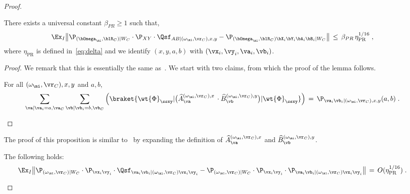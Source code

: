 \begin{proof}
	\begin{lemma}
		\label{lem:anchorpr_main_lemma}
		There exists a universal constant $\beta_{PR} \geq 1$ such that,
		\[
		\Ex_I \big \| \P_{(\bOmega_{\mi}, \blR_C) | W_C} \cdot \P_{XY} \cdot \Qsf_{AB | (\omega_{\mi}, \vr_C), x,y} - \P_{(\bOmega_{\mi}, \blR_C) \bX_i \bY_i  \bA_i \bB_i | W_C} \big \| \,\leq \, \beta_{PR}  \,\eta_{\text{PR}}^{1/16} \;,
		\]
		where $\eta_{\text{PR}}$ is defined in~\eqref{eq:delta} and we identify $(x,y,a,b)$ with $(\vx_i,\vy_i,\va_i,\vb_i)$.
		
	\end{lemma}
	\begin{proof}
		We remark that this is essentially the same as~\cite[Lemma 6.2]{bavarianAnchoredParallelRepetition2021}. We start with two claims, from which the proof of the lemma follows. 
		\begin{claim}\label{claim:main-1}
			For all $(\omega_{\mi}, \vr_C), x,y$ and $a,b$,
			\begin{equation*}\label{eq:anchorpr_main-2}
				\sum_{\va | \va_i = a, \va_C}\sum_{\vb | \vb_i = b, \vb_C}  \left(\braket{\wt{\Phi}_{\ssxy} | \big ( \widehat{A}^{(\omega_{\mi}, \vr_C), x}_\va \, \cdot \widehat{B}^{(\omega_{\mi}, \vr_C), y}_\vb \big ) |\wt{\Phi}_{\ssxy}  }\right) \,=\,\P_{\va_i \vb_i | (\omega_{\mi}, \vr_C),x,y}(a,b)\;.
			\end{equation*}
		\end{claim}
	\end{proof}
	
	The proof of this proposition is similar to~\cite[Claim 6.3]{bavarianAnchoredParallelRepetition2021} by expanding the definition of $\widehat{A}^{(\omega_{\mi}, \vr_C), x}_\va$ and  $\widehat{B}^{(\omega_{\mi}, \vr_C), y}_\vb$. 
	
	\begin{claim}\label{claim:main-2}
		The following holds:
		\begin{equation*}\label{eq:main-2-0}
			\Ex_I \big\| \P_{(\omega_{\mi}, \vr_C) |W_C} \cdot \P_{\vx_i \vy_i} \cdot \Qsf_{\va_i \vb_i |(\omega_{\mi}, \vr_C) \vx_i \vy_i } 
			-  \P_{(\omega_{\mi}, \vr_C) |W_C} \cdot \P_{\vx_i \vy_i} \cdot \P_{\va_i \vb_i | (\omega_{\mi}, \vr_C) \vx_i \vy_i} \big \|  
			\,=\,O(\eta_{\text{PR}}^{1/16})\;.
		\end{equation*}
	\end{claim}
	

\end{proof}
